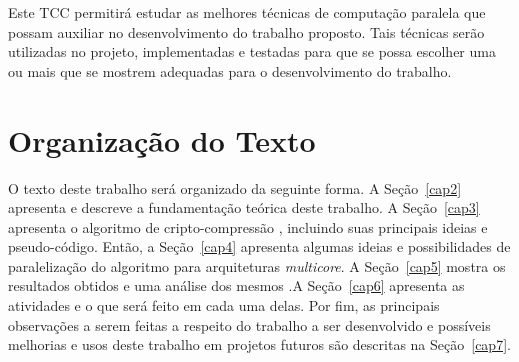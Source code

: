 Este TCC permitirá estudar as melhores técnicas de computação paralela que possam auxiliar no desenvolvimento do trabalho proposto. Tais técnicas serão utilizadas no projeto, implementadas e testadas para que se possa escolher uma ou mais que se mostrem adequadas para o desenvolvimento do trabalho.

\section{Organização do Texto}

O texto deste trabalho será organizado da seguinte forma. A Seção~\ref{cap2} apresenta e descreve a fundamentação teórica deste trabalho. A Seção~\ref{cap3} apresenta o algoritmo de cripto-compressão \gmpr, incluindo suas principais ideias e pseudo-código. Então, a Seção~\ref{cap4} apresenta algumas ideias e possibilidades de paralelização do algoritmo \gmpr para arquiteturas \textit{multicore}. A Seção~\ref{cap5} mostra os resultados obtidos e uma análise dos mesmos .A Seção~\ref{cap6} apresenta as atividades e o que será feito em cada uma delas. Por fim, as principais observações a serem feitas a respeito do trabalho a ser desenvolvido e possíveis melhorias e usos deste trabalho em projetos futuros são descritas na Seção~\ref{cap7}.
